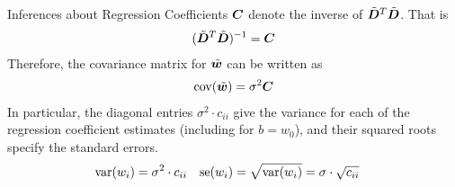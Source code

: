 \begin{frame}{Inferences about Regression Coefficients}
${\boldsymbol C}$ denote the inverse of $\tilde{{\boldsymbol D}}^T\tilde{{\boldsymbol D}}$. That is
\begin{align*}
    (\tilde{{\boldsymbol D}}^T\tilde{{\boldsymbol D}})^{-1} = {\boldsymbol C}
\end{align*}
Therefore, the covariance matrix for $\tilde{{\boldsymbol w}}$ can be written as
\begin{align*}
    \operatorname{cov}(\tilde{{\boldsymbol w}}) = \sigma^2 {\boldsymbol C}
\end{align*}
In particular, the diagonal entries $\sigma^2 \cdot c_{ii}$ give the
variance for each of the regression coefficient estimates (including for
$b = w_0$), and their squared roots specify the standard errors.
\begin{align*}
    \operatorname{var}(w_i) & = \sigma^2 \cdot c_{ii} & \operatorname{se}(w_i) & =
    \sqrt{\operatorname{var}(w_i)} = \sigma \cdot \sqrt{c_{ii}}
\end{align*}
%
\end{frame}


